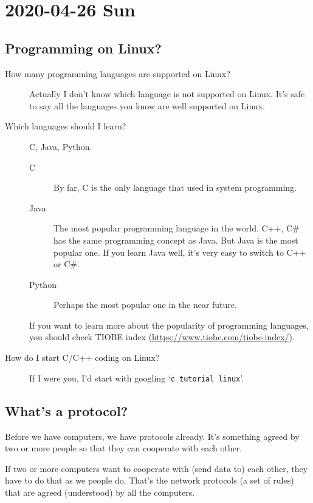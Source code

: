 \documentclass{article}
\begin{document}
\section{2020-04-26 Sun}
\label{sec:2020-04-26}

\subsection{Programming on Linux?}
\label{sec:programming-linux}

\begin{description}
\item[How many programming languages are supported on Linux?] Actually I don't know which
  language is not supported on Linux. It's safe to say all the languages you know are well
  supported on Linux.
\item[Which languages should I learn?] C, Java, Python.
  \begin{description}
  \item[C] By far, C is the only language that used in system programming.
  \item[Java] The most popular programming language in the world. C++, C\# has the same
    programming concept as Java. But Java is the most popular one. If you learn Java well,
    it's very easy to switch to C++ or C\#.
  \item[Python] Perhaps the most popular one in the near future.
  \end{description}
  If you want to learn more about the popularity of programming languages, you should
  check TIOBE index (\url{https://www.tiobe.com/tiobe-index/}).
\item[How do I start C/C++ coding on Linux?] If I were you, I'd start with googling
  `\texttt{c tutorial linux}'.
\end{description}


\subsection{What's a protocol?}
\label{sec:whats-protocol}

Before we have computers, we have protocols already. It's something agreed by
two or more people so that they can cooperate with each other.

If two or more computers want to cooperate with (send data to) each other, they have to do
that as we people do. That's the network protocols (a set of rules) that are agreed
(understood) by all the computers.
\end{document}

